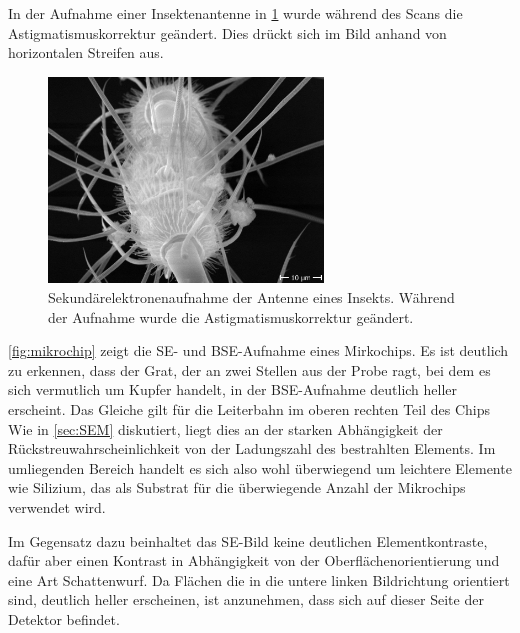 In der Aufnahme einer Insektenantenne in \cref{fig:astigmatenne} wurde während des Scans die Astigmatismuskorrektur geändert.
Dies drückt sich im Bild anhand von horizontalen Streifen aus.

\begin{figure}[!ht]
    \centering
    \includegraphics[width=0.65\textwidth]{img/SEM/10.9.20 11_09_41_Mag_ 1800x_astigmatism_introduced}
    \caption{Sekundärelektronenaufnahme der Antenne eines Insekts. Während der Aufnahme wurde die Astigmatismuskorrektur geändert.}
    \label{fig:astigmatenne}
\end{figure}

\cref{fig:mikrochip} zeigt die SE- und BSE-Aufnahme eines Mirkochips.
Es ist deutlich zu erkennen, dass der Grat, der an zwei Stellen aus der Probe ragt, bei dem es sich vermutlich um Kupfer handelt, in der BSE-Aufnahme deutlich heller erscheint.
Das Gleiche gilt für die Leiterbahn im oberen rechten Teil des Chips
Wie in \cref{sec:SEM} diskutiert, liegt dies an der starken Abhängigkeit der Rückstreuwahrscheinlichkeit von der Ladungszahl des bestrahlten Elements.
Im umliegenden Bereich handelt es sich also wohl überwiegend um leichtere Elemente wie Silizium, das als Substrat für die überwiegende Anzahl der Mikrochips verwendet wird.

Im Gegensatz dazu beinhaltet das SE-Bild keine deutlichen Elementkontraste, dafür aber einen Kontrast in Abhängigkeit von der Oberflächenorientierung und eine Art Schattenwurf.
Da Flächen die in die untere linken Bildrichtung orientiert sind, deutlich heller erscheinen, ist anzunehmen, dass sich auf dieser Seite der Detektor befindet.

